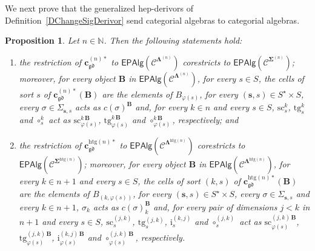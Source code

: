 \documentclass[a4paper, reqno]{amsbook}
\newcommand{\sig}[1]{\mathbf{#1}}             %
\newcommand{\spec}[1]{\boldsymbol{\mathcal{#1}}} %
\newcommand{\gd}{\mathfrak{gd}}              %
\newcommand{\htg}{\mathrm{htg}}                %
\newcommand{\src}{\mathrm{sc}}
\newcommand{\tgt}{\mathrm{tg}}
\theoremstyle{plain}
\newtheorem{proposition}[theorem]{Proposition}
\theoremstyle{definition}
\begin{document}
We next prove that the generalized hep-derivors of Definition~\ref{DChangeSigDerivor} send categorial algebras to categorial algebras.

\begin{proposition}\label{PChangeSigEpVariety}
Let $n\in\mathbb{N}$.
Then the following statements hold:
\begin{enumerate}
\item the restriction of $\mathbf{c}^{(n)\ast}_{\gd}$ to $\mathsf{EPAlg}(\spec{C}^{\sig{\Lambda}^{(n)}})$ corestricts to $\mathsf{EPAlg}(\spec{C}^{\sig{\Sigma}^{(n)}})$; moreover, for every object $\mathbf{B}$ in $\mathsf{EPAlg}(\spec{C}^{\sig{\Lambda}^{(n)}})$, for every $s\in S$, the cells of sort $s$ of $\mathbf{c}^{(n)\ast}_{\gd}(\mathbf{B})$ are the elements of $B_{\varphi(s)}$, for every $(\mathbf{s},s)\in S^{\star}\times S$, every $\sigma\in\Sigma_{\mathbf{s},s}$ acts as $c(\sigma)^{\mathbf{B}}$ and, for every $k\in n$ and every $s\in S$, $\src^{k}_{s}$, $\tgt^{k}_{s}$ and $\circ^{k}_{s}$ act as $\src^{k\,\mathbf{B}}_{\varphi(s)}$, $\tgt^{k\,\mathbf{B}}_{\varphi(s)}$ and $\circ^{k\,\mathbf{B}}_{\varphi(s)}$, respectively; and
\item the restriction of $\mathbf{c}^{\htg(n)\ast}_{\gd}$ to $\mathsf{EPAlg}(\spec{C}^{\sig{\Lambda}^{\htg(n)}})$ corestricts to $\mathsf{EPAlg}(\spec{C}^{\sig{\Sigma}^{\htg(n)}})$; moreover, for every object $\mathbf{B}$ in $\mathsf{EPAlg}(\spec{C}^{\sig{\Lambda}^{\htg(n)}})$, for every $k\in n+1$ and every $s\in S$, the cells of sort $(k,s)$ of $\mathbf{c}^{\htg(n)\ast}_{\gd}(\mathbf{B})$ are the elements of $B_{(k,\varphi(s))}$, for every $(\mathbf{s},s)\in S^{\star}\times S$, every $\sigma\in\Sigma_{\mathbf{s},s}$ and every $k\in n+1$, $\sigma_{k}$ acts as $c(\sigma)_{k}^{\mathbf{B}}$ and, for every pair of dimensions $j<k$ in $n+1$ and every $s\in S$, $\src^{(j,k)}_{s}$, $\tgt^{(j,k)}_{s}$, $\mathrm{i}^{(k,j)}_{s}$ and $\circ^{(j,k)}_{s}$ act as $\src^{(j,k)\,\mathbf{B}}_{\varphi(s)}$, $\tgt^{(j,k)\,\mathbf{B}}_{\varphi(s)}$, $\mathrm{i}^{(k,j)\,\mathbf{B}}_{\varphi(s)}$ and $\circ^{(j,k)\,\mathbf{B}}_{\varphi(s)}$, respectively.
\end{enumerate}
\end{proposition}
\end{document}
